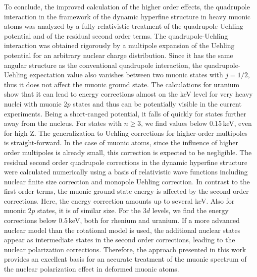 To conclude, the improved calculation of the higher order effects, the quadrupole interaction in the framework of the dynamic hyperfine structure in heavy muonic atoms was analyzed by a fully relativistic treatment of the quadrupole-Uehling potential and of the residual second order terms.
The quadrupole-Uehling interaction was obtained rigorously by a multipole expansion of the Uehling potential for an arbitrary nuclear charge distribution.
Since it has the same angular structure as the conventional quadrupole interaction, the quadrupole-Uehling expectation value also vanishes between two muonic states with $j=1/2$, thus it does not affect the muonic ground state.
The calculations for uranium show that it can lead to energy corrections almost on the keV level for very heavy nuclei with muonic $2p$ states and thus can be potentially visible in the current experiments. Being a short-ranged potential, it falls of quickly for states further away from the nucleus. For states with $n\geq3$, we find values below $0.15\,$keV, even for high Z.
The generalization to Uehling corrections for higher-order multipoles is straight-forward. In the case of muonic atoms, since the influence of higher order multipoles is already small, this correction is expected to be negligible.
The residual second order quadrupole corrections in the dynamic hyperfine structure were calculated numerically using a basis of relativistic wave functions including nuclear finite size correction and monopole Uehling correction.
In contrast to the first order terms, the muonic ground state energy is affected by the second order corrections. Here, the energy correction amounts up to several keV. Also for muonic $2p$ states, it is of similar size. For the $3d$ levels, we find the energy corrections below $0.5\,$keV, both for rhenium and uranium.
If a more advanced nuclear model than the rotational model is used, the additional nuclear states appear as intermediate states in the second order corrections, leading to the nuclear polarization corrections. Therefore, the approach presented in this work provides an excellent basis for an accurate treatment of the muonic spectrum of the nuclear polarization effect in deformed muonic atoms.

